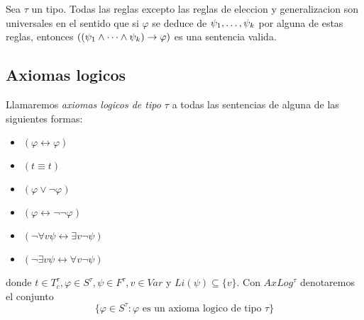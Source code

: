 \begin{lemma}
  Sea $\tau$ un tipo. Todas las reglas excepto las reglas de eleccion y generalizacion son universales en el sentido que si $\varphi$ se deduce de $\succession{\psi}{1}{k}$ por alguna de estas reglas,
  entonces $((\succession[\land]{\psi}{1}{k})\rightarrow\varphi)$ es una sentencia valida.
\end{lemma}

\subsection{Axiomas logicos}
\begin{definition}
  Llamaremos \emph{axiomas logicos de tipo $\tau$} a todas las sentencias de alguna de las siguientes formas:
  \begin{itemize}
    \item $(\varphi\leftrightarrow\varphi)$
    \item $(t\equiv t)$
    \item $(\varphi\lor\neg\varphi)$
    \item $(\varphi\leftrightarrow\neg\neg\varphi)$
    \item $(\neg\forall v\psi\leftrightarrow\exists v\neg\psi)$
    \item $(\neg\exists v\psi\leftrightarrow\forall v\neg\psi)$
  \end{itemize}
  donde $t \in T_c^\tau, \varphi\in S^\tau, \psi\in F^\tau, v\in Var$ y $Li(\psi) \subseteq \{v\}$. Con $AxLog^\tau$ denotaremos el conjunto
  $$
  \{\varphi \in S^\tau : \varphi \text{ es un axioma logico de tipo } \tau\}
  $$
\end{definition}

